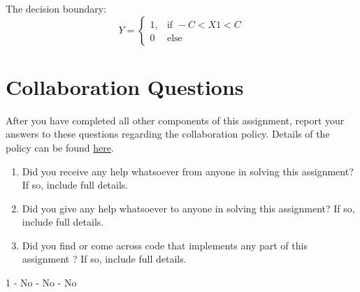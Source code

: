 \documentclass[11pt,addpoints,answers]{exam}
\begin{document}
\begin{questions}
\begin{your_solution}[title=Your answer,height=7cm,width=15cm]
        The decision boundary: \newline
        \[
        Y = \begin{cases}
		1, &\mbox{if }  -C < X1 < C\\
		0 &\mbox{else }
		\end{cases}
		\]
    \end{your_solution}

    
    
    
\end{questions}

\clearpage\newpage
\section{Collaboration Questions}
After you have completed all other components of this assignment, report your answers to these questions regarding the collaboration policy. Details of the policy can be found \href{http://www.cs.cmu.edu/~mgormley/courses/10601/syllabus.html}{here}.
\begin{enumerate}
    \item Did you receive any help whatsoever from anyone in solving this assignment? If so, include full details.
    \item Did you give any help whatsoever to anyone in solving this assignment? If so, include full details.
    \item Did you find or come across code that implements any part of this assignment ? If so, include full details.
\end{enumerate}

\begin{your_solution}[height=6cm]
1 - No - No - No\newline
\end{your_solution}
\end{document}
